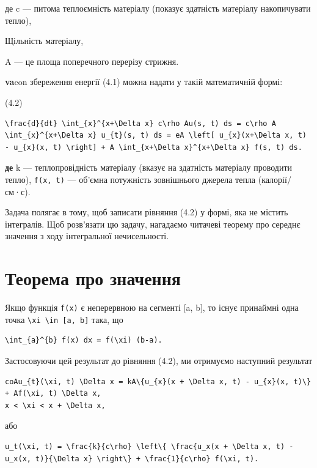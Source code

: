 \documentclass[
  ukrainian,
]{article}
\begin{document}
де c --- питома теплоємність матеріалу (показує здатність матеріалу
накопичувати тепло),

Щільність матеріалу,

A --- це площа поперечного перерізу стрижня.

\textbf{va}con збереження енергії (4.1) можна надати у такій
математичній формі:

(4.2)

\begin{verbatim}
\frac{d}{dt} \int_{x}^{x+\Delta x} c\rho Au(s, t) ds = c\rho A \int_{x}^{x+\Delta x} u_{t}(s, t) ds = eA \left[ u_{x}(x+\Delta x, t) - u_{x}(x, t) \right] + A \int_{x+\Delta x}^{x+\Delta x} f(s, t) ds.
\end{verbatim}

\textbf{де} k --- теплопровідність матеріалу (вказує на здатність
матеріалу проводити тепло), \texttt{f(x,\ t)} --- об'ємна потужність
зовнішнього джерела тепла (калорії/см·с).

Задача полягає в тому, щоб записати рівняння (4.2) у формі, яка не
містить інтегралів. Щоб розв'язати цю задачу, нагадаємо читачеві теорему
про середнє значення з ходу інтегральної нечисельності.

\section{Теорема про
значення}\label{ux442ux435ux43eux440ux435ux43cux430-ux43fux440ux43e-ux437ux43dux430ux447ux435ux43dux43dux44f}

Якщо функція \texttt{f(x)} є неперервною на сегменті {[}a, b{]}, то
існує принаймні одна точка
\texttt{\textbackslash{}xi\ \textbackslash{}in\ {[}a,\ b{]}} така, що

\begin{verbatim}
\int_{a}^{b} f(x) dx = f(\xi) (b-a).
\end{verbatim}

Застосовуючи цей результат до рівняння (4.2), ми отримуємо наступний
результат

\begin{verbatim}
coAu_{t}(\xi, t) \Delta x = kA\{u_{x}(x + \Delta x, t) - u_{x}(x, t)\} + Af(\xi, t) \Delta x,
x < \xi < x + \Delta x,
\end{verbatim}

або

\begin{verbatim}
u_t(\xi, t) = \frac{k}{c\rho} \left\{ \frac{u_x(x + \Delta x, t) - u_x(x, t)}{\Delta x} \right\} + \frac{1}{c\rho} f(\xi, t).
\end{verbatim}
\end{document}
